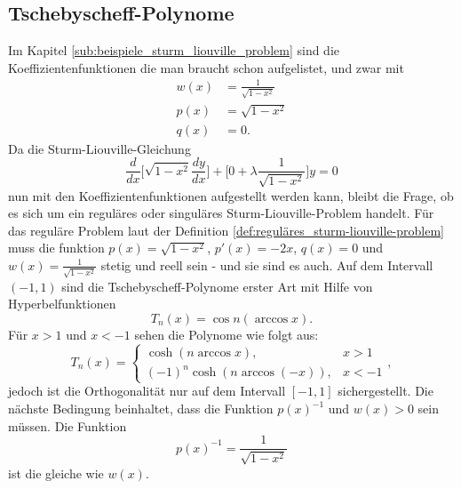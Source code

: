 %
%
%

\subsection{Tschebyscheff-Polynome\label{sub:tschebyscheff-polynome}}
Im Kapitel \ref{sub:beispiele_sturm_liouville_problem} sind die Koeffizientenfunktionen die man braucht schon aufgelistet, und zwar mit
\begin{align*}
	w(x) &= \frac{1}{\sqrt{1-x^2}} \\
	p(x) &= \sqrt{1-x^2} \\
	q(x) &= 0.
\end{align*}
Da die Sturm-Liouville-Gleichung
\begin{equation}
	\label{eq:sturm-liouville-equation-tscheby}
	\frac{d}{dx}\lbrack \sqrt{1-x^2} \frac{dy}{dx} \rbrack + \lbrack 0 + \lambda \frac{1}{\sqrt{1-x^2}} \rbrack y = 0 
\end{equation}
nun mit den Koeffizientenfunktionen aufgestellt werden kann, bleibt die Frage, ob es sich um ein reguläres oder singuläres Sturm-Liouville-Problem handelt.
Für das reguläre Problem laut der Definition \ref{def:reguläres_sturm-liouville-problem} muss die funktion $p(x) = \sqrt{1-x^2}$, $p'(x) = -2x$, $q(x) = 0$ und $w(x) = \frac{1}{\sqrt{1-x^2}}$ stetig und reell sein - und sie sind es auch.
Auf dem Intervall $(-1,1)$ sind die Tschebyscheff-Polynome erster Art mit Hilfe von Hyperbelfunktionen
\[
	T_n(x) = \cos n (\arccos x).
\]
Für $x>1$ und $x<-1$ sehen die Polynome wie folgt aus:
\[
	T_n(x) = \left\{\begin{array}{ll} \cosh (n \arccos x), & x > 1\\
		(-1)^n \cosh (n \arccos (-x)), & x<-1 \end{array}\right.,
\]
jedoch ist die Orthogonalität nur auf dem Intervall $[ -1, 1]$ sichergestellt.
Die nächste Bedingung beinhaltet, dass die Funktion $p(x)^{-1}$ und $w(x)>0$ sein müssen.
Die Funktion
\begin{equation*}
	p(x)^{-1} = \frac{1}{\sqrt{1-x^2}}
\end{equation*}
ist die gleiche wie $w(x)$.

